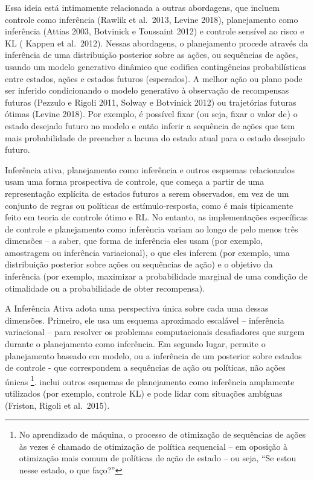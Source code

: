 \documentclass[
  12pt,
]{book}
\begin{document}
Essa ideia está intimamente relacionada a outras abordagens, que incluem controle como inferência (Rawlik et al.~2013, Levine 2018), planejamento como inferência (Attias 2003, Botvinick e Toussaint 2012) e controle sensível ao risco e KL ( Kappen et al.~2012). Nessas abordagens, o planejamento procede através da inferência de uma distribuição posterior sobre as ações, ou sequências de ações, usando um modelo generativo dinâmico que codifica contingências probabilísticas entre estados, ações e estados futuros (esperados). A melhor ação ou plano pode ser inferido condicionando o modelo generativo à observação de recompensas futuras (Pezzulo e Rigoli 2011, Solway e Botvinick 2012) ou trajetórias futuras ótimas (Levine 2018). Por exemplo, é possível fixar (ou seja, fixar o valor de ) o estado desejado futuro no modelo e então inferir a sequência de ações que tem mais probabilidade de preencher a lacuna do estado atual para o estado desejado futuro.

Inferência ativa, planejamento como inferência e outros esquemas relacionados usam uma forma prospectiva de controle, que começa a partir de uma representação explícita de estados futuros a serem observados, em vez de um conjunto de regras ou políticas de estímulo-resposta, como é mais tipicamente feito em teoria de controle ótimo e RL. No entanto, as implementações específicas de controle e planejamento como inferência variam ao longo de pelo menos três dimensões -- a saber, que forma de inferência eles usam (por exemplo, amostragem ou inferência variacional), o que eles inferem (por exemplo, uma distribuição posterior sobre ações ou sequências de ação) e o objetivo da inferência (por exemplo, maximizar a probabilidade marginal de uma condição de otimalidade ou a probabilidade de obter recompensa).

A Inferência Ativa adota uma perspectiva única sobre cada uma dessas dimensões. Primeiro, ele usa um esquema aproximado escalável -- inferência variacional -- para resolver os problemas computacionais desafiadores que surgem durante o planejamento como inferência. Em segundo lugar, permite o planejamento baseado em modelo, ou a inferência de um posterior sobre estados de controle - que correspondem a sequências de ação ou políticas, não ações únicas \footnote{No aprendizado de máquina, o processo de otimização de sequências de ações às vezes é chamado de otimização de política sequencial -- em oposição à otimização mais comum de políticas de ação de estado -- ou seja, ``Se estou nesse estado, o que faço?''}. inclui outros esquemas de planejamento como inferência amplamente utilizados (por exemplo, controle KL) e pode lidar com situações ambíguas (Friston, Rigoli et al.~2015).
\end{document}
